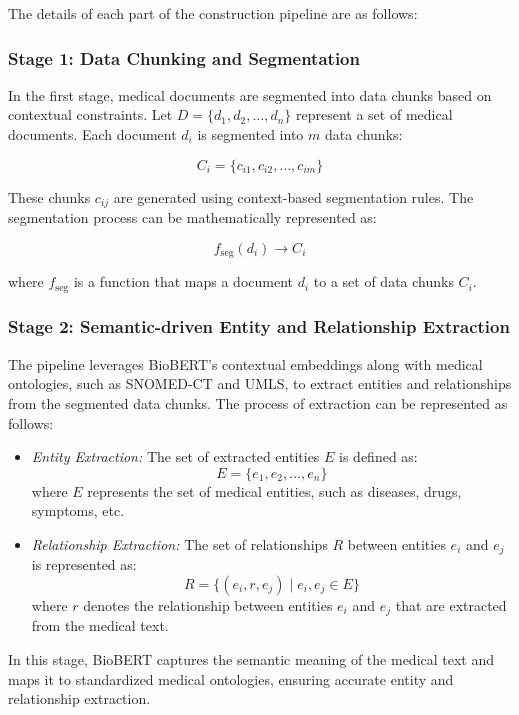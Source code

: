 \documentclass[letterpaper]{article} %
\begin{document}
The details of each part of the construction pipeline are as follows:
\subsubsection*{Stage 1: Data Chunking and Segmentation}
In the first stage, medical documents are segmented into data chunks based on contextual constraints. Let \( D = \{d_1, d_2, \dots, d_n\} \) represent a set of medical documents. Each document \( d_i \) is segmented into \( m \) data chunks: 

\[
C_{i} = \{c_{i1}, c_{i2}, \dots, c_{im}\}
\]

These chunks \( c_{ij} \) are generated using context-based segmentation rules. The segmentation process can be mathematically represented as:

\[
f_{\text{seg}}(d_i) \rightarrow C_i
\]

where \( f_{\text{seg}} \) is a function that maps a document \( d_i \) to a set of data chunks \( C_i \).

\subsubsection*{Stage 2: Semantic-driven Entity and Relationship Extraction}
The pipeline leverages BioBERT's contextual embeddings along with medical ontologies, such as SNOMED-CT and UMLS, to extract entities and relationships from the segmented data chunks. The process of extraction can be represented as follows:

\begin{itemize}
    \item \emph{Entity Extraction:} The set of extracted entities \( E \) is defined as:
    \[
    E = \{e_1, e_2, \dots, e_n\}
    \]
    where \( E \) represents the set of medical entities, such as diseases, drugs, symptoms, etc.
    
    \item \emph{Relationship Extraction:} The set of relationships \( R \) between entities \( e_i \) and \( e_j \) is represented as:
    \[
    R = \{(e_i, r, e_j) \mid e_i, e_j \in E\}
    \]
    where \( r \) denotes the relationship between entities \( e_i \) and \( e_j \) that are extracted from the medical text.
\end{itemize}

In this stage, BioBERT captures the semantic meaning of the medical text and maps it to standardized medical ontologies, ensuring accurate entity and relationship extraction.
\end{document}
